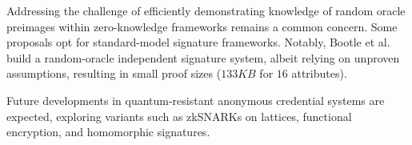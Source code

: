 Addressing the challenge of efficiently demonstrating knowledge of random oracle preimages within zero-knowledge frameworks remains a common concern. Some proposals opt for standard-model signature frameworks. Notably, Bootle et al. \cite{bootleFrameworkPracticalAnonymous2023} build a random-oracle independent signature system, albeit relying on unproven assumptions, resulting in small proof sizes ($133KB$ for $16$ attributes).

Future developments in quantum-resistant anonymous credential systems are expected, exploring variants such as zkSNARKs on lattices\cite{boschiniEfficientPostquantumSNARKs2020}, functional encryption\cite{bonehFunctionalEncryptionDefinitions2011}, and homomorphic signatures\cite{gorbunovLeveledFullyHomomorphic2015}.


